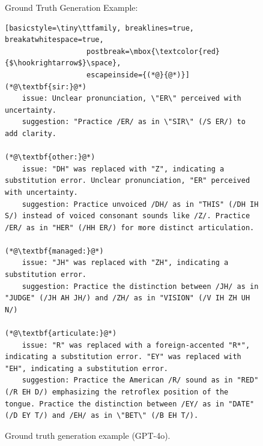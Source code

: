 \documentclass[11pt]{article}
\begin{document}
\begin{figure}[ht]
\begin{AIBox}{Ground Truth Generation Example:}
\begin{minipage}[t]{\textwidth}
\begin{lstlisting}[basicstyle=\tiny\ttfamily, breaklines=true, breakatwhitespace=true,
                   postbreak=\mbox{\textcolor{red}{$\hookrightarrow$}\space},
                   escapeinside={(*@}{@*)}]
(*@\textbf{sir:}@*)
    issue: Unclear pronunciation, \"ER\" perceived with uncertainty.
    suggestion: "Practice /ER/ as in \"SIR\" (/S ER/) to add clarity.
    
(*@\textbf{other:}@*)
    issue: "DH" was replaced with "Z", indicating a substitution error. Unclear pronunciation, "ER" perceived with uncertainty.
    suggestion: Practice unvoiced /DH/ as in "THIS" (/DH IH S/) instead of voiced consonant sounds like /Z/. Practice /ER/ as in "HER" (/HH ER/) for more distinct articulation.

(*@\textbf{managed:}@*)
    issue: "JH" was replaced with "ZH", indicating a substitution error.
    suggestion: Practice the distinction between /JH/ as in "JUDGE" (/JH AH JH/) and /ZH/ as in "VISION" (/V IH ZH UH N/)
    
(*@\textbf{articulate:}@*)
    issue: "R" was replaced with a foreign-accented "R*", indicating a substitution error. "EY" was replaced with "EH", indicating a substitution error.
    suggestion: Practice the American /R/ sound as in "RED" (/R EH D/) emphasizing the retroflex position of the tongue. Practice the distinction between /EY/ as in "DATE" (/D EY T/) and /EH/ as in \"BET\" (/B EH T/).

\end{lstlisting}
\end{minipage}

\end{AIBox}
\caption{Ground truth generation example (GPT-4o).}
\label{fig:ground_truth_generation_example}
\end{figure}
\end{document}
